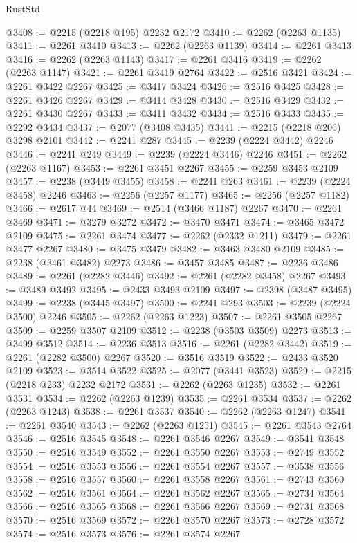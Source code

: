 \begin{lexlean}{RustStd}
\begin{coremodule}
@3408 := @2215 (@2218 @195) @2232 @2172
@3410 := @2262 (@2263 @1135)
@3411 := @2261 @3410
@3413 := @2262 (@2263 @1139)
@3414 := @2261 @3413
@3416 := @2262 (@2263 @1143)
@3417 := @2261 @3416
@3419 := @2262 (@2263 @1147)
@3421 := @2261 @3419 @2764
@3422 := @2516 @3421
@3424 := @2261 @3422 @2267
@3425 := @3417 @3424
@3426 := @2516 @3425
@3428 := @2261 @3426 @2267
@3429 := @3414 @3428
@3430 := @2516 @3429
@3432 := @2261 @3430 @2267
@3433 := @3411 @3432
@3434 := @2516 @3433
@3435 := @2292 @3434
@3437 := @2077 (@3408 @3435)
@3441 := @2215 (@2218 @206) @3298 @2101
@3442 := @2241 @287
@3445 := @2239 (@2224 @3442) @2246
@3446 := @2241 @249
@3449 := @2239 (@2224 @3446) @2246
@3451 := @2262 (@2263 @1167)
@3453 := @2261 @3451 @2267
@3455 := @2259 @3453 @2109
@3457 := @2238 (@3449 @3455)
@3458 := @2241 @263
@3461 := @2239 (@2224 @3458) @2246
@3463 := @2256 (@2257 @1177)
@3465 := @2256 (@2257 @1182)
@3466 := @2617 @44
@3469 := @2514 (@3466 @1187) @2267
@3470 := @2261 @3469
@3471 := @3279 @3272
@3472 := @3470 @3471
@3474 := @3465 @3472 @2109
@3475 := @2261 @3474
@3477 := @2262 (@2332 @1211)
@3479 := @2261 @3477 @2267
@3480 := @3475 @3479
@3482 := @3463 @3480 @2109
@3485 := @2238 (@3461 @3482) @2273
@3486 := @3457 @3485
@3487 := @2236 @3486
@3489 := @2261 (@2282 @3446)
@3492 := @2261 (@2282 @3458) @2267
@3493 := @3489 @3492
@3495 := @2433 @3493 @2109
@3497 := @2398 (@3487 @3495)
@3499 := @2238 (@3445 @3497)
@3500 := @2241 @293
@3503 := @2239 (@2224 @3500) @2246
@3505 := @2262 (@2263 @1223)
@3507 := @2261 @3505 @2267
@3509 := @2259 @3507 @2109
@3512 := @2238 (@3503 @3509) @2273
@3513 := @3499 @3512
@3514 := @2236 @3513
@3516 := @2261 (@2282 @3442)
@3519 := @2261 (@2282 @3500) @2267
@3520 := @3516 @3519
@3522 := @2433 @3520 @2109
@3523 := @3514 @3522
@3525 := @2077 (@3441 @3523)
@3529 := @2215 (@2218 @233) @2232 @2172
@3531 := @2262 (@2263 @1235)
@3532 := @2261 @3531
@3534 := @2262 (@2263 @1239)
@3535 := @2261 @3534
@3537 := @2262 (@2263 @1243)
@3538 := @2261 @3537
@3540 := @2262 (@2263 @1247)
@3541 := @2261 @3540
@3543 := @2262 (@2263 @1251)
@3545 := @2261 @3543 @2764
@3546 := @2516 @3545
@3548 := @2261 @3546 @2267
@3549 := @3541 @3548
@3550 := @2516 @3549
@3552 := @2261 @3550 @2267
@3553 := @2749 @3552
@3554 := @2516 @3553
@3556 := @2261 @3554 @2267
@3557 := @3538 @3556
@3558 := @2516 @3557
@3560 := @2261 @3558 @2267
@3561 := @2743 @3560
@3562 := @2516 @3561
@3564 := @2261 @3562 @2267
@3565 := @2734 @3564
@3566 := @2516 @3565
@3568 := @2261 @3566 @2267
@3569 := @2731 @3568
@3570 := @2516 @3569
@3572 := @2261 @3570 @2267
@3573 := @2728 @3572
@3574 := @2516 @3573
@3576 := @2261 @3574 @2267

\end{coremodule}
\end{lexlean}
